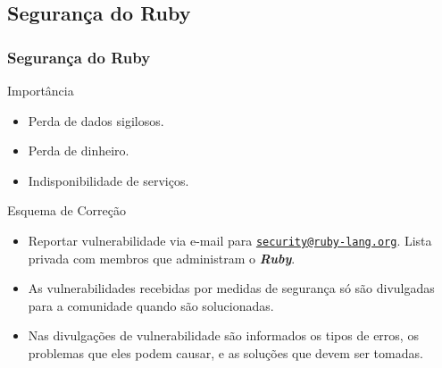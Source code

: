 \subsection{Segurança do Ruby} 
\begin{frame}
 \frametitle{Segurança do Ruby}
 
  \begin{block}{Importância}
   
   \begin{itemize}    

   \item Perda de dados sigilosos.
   
   \item Perda de dinheiro.
   
   \item Indisponibilidade de serviços.
   
   \end{itemize}
   
  \end{block}
  
    \begin{block}{Esquema de Correção}
   
   \begin{itemize}    

   \item Reportar vulnerabilidade via e-mail para 
   \href{mailto:security@ruby-lang.org}{\nolinkurl{security@ruby-lang.org}}. Lista privada com membros 
   que administram o \emph{\textbf{Ruby}}.
   
   \item As vulnerabilidades recebidas por medidas de segurança só são divulgadas para a comunidade quando são 
   solucionadas.
   
   \item Nas divulgações de vulnerabilidade são informados os tipos de erros, os problemas que eles podem causar, 
   e as soluções que devem ser tomadas.
   
   \end{itemize}
   
  \end{block}
 
\end{frame}


